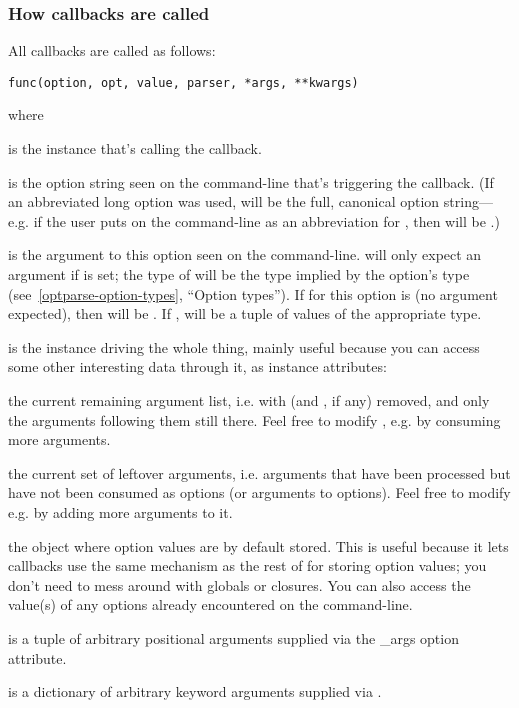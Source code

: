 \subsubsection{How callbacks are called\label{optparse-callbacks-called}}

All callbacks are called as follows:

\begin{verbatim}
func(option, opt, value, parser, *args, **kwargs)
\end{verbatim}

where

\begin{definitions}
is the  instance that's calling the callback.

is the option string seen on the command-line that's triggering the
callback.  (If an abbreviated long option was used,  will be
the full, canonical option string---e.g. if the user puts
 on the command-line as an abbreviation for
, then  will be
.)

is the argument to this option seen on the command-line.
 will only expect an argument if  is
set; the type of  will be the type implied by the
option's type (see~\ref{optparse-option-types}, ``Option types'').  If
 for this option is  (no argument expected), then
 will be .  If ,  will
be a tuple of values of the appropriate type.

is the  instance driving the whole thing, mainly
useful because you can access some other interesting data through it,
as instance attributes:

\begin{definitions}
the current remaining argument list, i.e. with  (and
, if any) removed, and only the arguments following
them still there.  Feel free to modify ,
e.g. by consuming more arguments.
    
the current set of leftover arguments, i.e. arguments that have been
processed but have not been consumed as options (or arguments to
options).  Feel free to modify  e.g. by adding
more arguments to it.
    
the object where option values are by default stored.  This is useful
because it lets callbacks use the same mechanism as the rest of
 for storing option values; you don't need to mess
around with globals or closures.  You can also access the value(s) of
any options already encountered on the command-line.
\end{definitions}

is a tuple of arbitrary positional arguments supplied via the
_args option attribute.

is a dictionary of arbitrary keyword arguments supplied via
.
\end{definitions}

